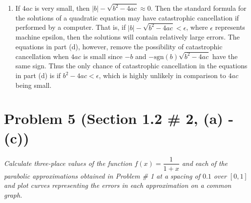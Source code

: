 \documentclass[12pt]{article}
\begin{document}
\begin{enumerate}[\ (a)\ ]
\begin{enumerate}[\ (i) \ ]
\end{enumerate}

\item {}
If $4ac$ is very small, then $|b| - \sqrt{b^2 - 4ac} \approx 0$.  Then the standard formula for the solutions of a quadratic equation may have catastrophic cancellation if performed by a computer.  That is, if $|b| - \sqrt{b^2 - 4ac} < \epsilon$, where $\epsilon$ represents machine epsilon, then the solutions will contain relatively large errors.  The equations in part (d), however, remove the possibility of catastrophic cancellation when $4ac$ is small since $-b$ and $-\text{sgn}(b)\sqrt{b^2 - 4ac}$ have the same sign.  Thus the only chance of catastrophic cancellation in the equations in part (d) is if $b^2 - 4ac < \epsilon$, which is highly unlikely in comparison to $4ac$ being small.

\end{enumerate}

\section*{Problem 5 (Section 1.2 \# 2, (a) - (c))}
{\it Calculate three-place values of the function $f(x) = \dfrac{1}{1 + x}$ and each of the parabolic approximations obtained in Problem \# 1 at a spacing of $0.1$ over $[0,1]$ and plot curves representing the errors in each approximation on a common graph.} \\
\end{document}
